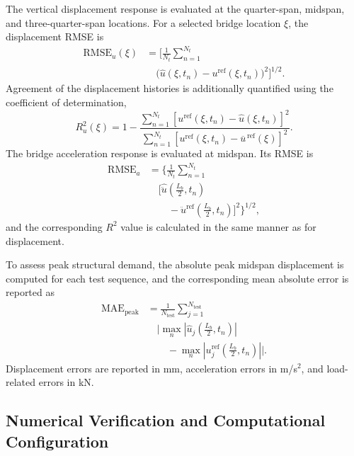 \documentclass[journal]{IEEEtran}
\begin{document}
The vertical displacement response is evaluated at the quarter-span, midspan, and three-quarter-span locations. For a selected bridge location $\xi$, the displacement RMSE is
\begin{equation}
\begin{aligned}
\mathrm{RMSE}_{u}(\xi)&=\Biggl[\frac{1}{N_t}\sum_{n=1}^{N_t}\\
&\quad\bigl(\widehat{u}(\xi,t_n)-u^{\mathrm{ref}}(\xi,t_n)\bigr)^2\Biggr]^{1/2}.
\end{aligned}
\end{equation}
Agreement of the displacement histories is additionally quantified using the coefficient of determination,
\begin{equation}
R_u^2(\xi)=1-\frac{\displaystyle\sum_{n=1}^{N_t}\left[u^{\mathrm{ref}}(\xi,t_n)-\widehat{u}(\xi,t_n)\right]^2}{\displaystyle\sum_{n=1}^{N_t}\left[u^{\mathrm{ref}}(\xi,t_n)-\overline{u}^{\,\mathrm{ref}}(\xi)\right]^2}.
\end{equation}
The bridge acceleration response is evaluated at midspan. Its RMSE is
\begin{equation}
\begin{aligned}
\mathrm{RMSE}_{a}&=\Biggl\{\frac{1}{N_t}\sum_{n=1}^{N_t}\\
&\quad\Biggl[\widehat{\ddot{u}}\left(\frac{L_b}{2},t_n\right)\\
&\qquad-\ddot{u}^{\mathrm{ref}}\left(\frac{L_b}{2},t_n\right)\Biggr]^2\Biggr\}^{1/2},
\end{aligned}
\end{equation}
and the corresponding $R^2$ value is calculated in the same manner as for displacement.

To assess peak structural demand, the absolute peak midspan displacement is computed for each test sequence, and the corresponding mean absolute error is reported as
\begin{equation}
\begin{aligned}
\mathrm{MAE}_{\mathrm{peak}}&=\frac{1}{N_{\mathrm{test}}}\sum_{j=1}^{N_{\mathrm{test}}}\\
&\quad\Biggl|\max_n\left|\widehat{u}_j\left(\frac{L_b}{2},t_n\right)\right|\\
&\qquad-\max_n\left|u_j^{\mathrm{ref}}\left(\frac{L_b}{2},t_n\right)\right|\Biggr|.
\end{aligned}
\end{equation}
Displacement errors are reported in mm, acceleration errors in m/s$^2$, and load-related errors in kN.

\subsection{Numerical Verification and Computational Configuration}
\end{document}
